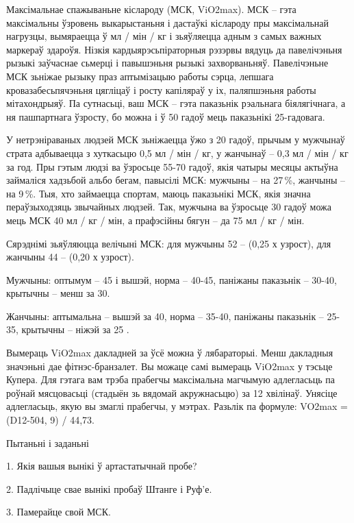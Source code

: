 Максімальнае спажываньне кіслароду (МСК, ViO2max). МСК – гэта максімальны ўзровень выкарыстаньня і дастаўкі кіслароду пры максімальнай нагрузцы, вымяраецца ў мл / мін / кг і зьяўляецца адным з самых важных маркераў здароўя. Нізкія кардыярэсьпіраторныя рэзэрвы вядуць да павелічэньня рызыкі заўчаснае сьмерці і павышэньня рызыкі захворваньняў. Павелічэньне МСК зьніжае рызыку праз аптымізацыю работы сэрца, лепшага кровазабесьпячэньня цягліцаў і росту капіляраў у іх, паляпшэньня работы мітахондрыяў. Па сутнасьці, ваш МСК – гэта паказьнік рэальнага біялягічнага, а ня пашпартнага ўзросту, бо можна і ў 50 гадоў мець паказьнікі 25-гадовага. 

У нетрэніраваных людзей МСК зьніжаецца ўжо з 20 гадоў, прычым у мужчынаў страта адбываецца з хуткасьцю 0,5 мл / мін / кг, у жанчынаў – 0,3 мл / мін / кг за год. Пры гэтым людзі ва ўзросьце 55-70 гадоў, якія чатыры месяцы актыўна займаліся хадзьбой альбо бегам, павысілі МСК: мужчыны – на 27\,\%, жанчыны – на 9\,\%. Тыя, хто займаецца спортам, маюць паказьнікі МСК, якія значна пераўзыходзяць звычайных людзей. Так, мужчына ва ўзросьце 30 гадоў можа мець МСК 40 мл / кг / мін, а прафэсійны бягун – да 75 мл / кг / мін.

Сярэднімі зьяўляюцца велічыні МСК: для мужчыны 52 – (0,25 х узрост), для жанчыны 44 – (0,20 х узрост). 

Мужчыны: оптымум – 45 і вышэй, норма – 40-45, паніжаны паказьнік – 30-40, крытычны – менш за 30. 

Жанчыны: аптымальна – вышэй за 40, норма – 35-40, паніжаны паказьнік – 25-35, крытычны – ніжэй за 25 .

Вымераць ViO2max дакладней за ўсё можна ў лябараторыі. Менш дакладныя значэньні дае фітнэс-бранзалет. Вы можаце самі вымераць ViO2max у тэсьце Купера. Для гэтага вам трэба прабегчы максімальна магчымую адлегласьць па роўнай мясцовасьці (стадыён зь вядомай акружнасьцю) за 12 хвілінаў. Унясіце адлегласьць, якую вы змаглі прабегчы, у мэтрах. Разьлік па формуле: VO2max = (D12-504, 9) / 44,73.

Пытаньні і заданьні

1. Якія вашыя вынікі ў артастатычнай пробе?

2. Падлічыце свае вынікі пробаў Штанге і Руф'е.

3. Памерайце свой МСК.

